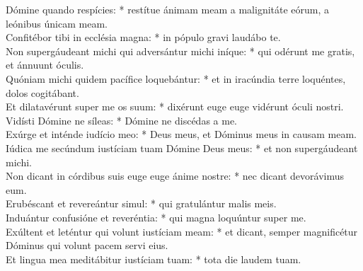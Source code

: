 {	Dómine quando respícies: * restítue ánimam meam a malignitáte eórum, a leónibus únicam meam. \\
	Confitébor tibi in ecclésia magna: * in pópulo gravi laudábo te. \\
	Non supergáudeant michi qui adversántur michi iníque: * qui odérunt me gratis, et ánnuunt óculis. \\
	Quóniam michi quidem pacífice loquebántur: * et in iracúndia terre loquéntes, dolos cogitábant. \\
	Et dilatavérunt super me os suum: * dixérunt euge euge vidérunt óculi nostri. \\
	Vidísti Dómine ne síleas: * Dómine ne discédas a me. \\
	Exúrge et inténde iudício meo: * Deus meus, et Dóminus meus in causam meam. \\
	Iúdica me secúndum iustíciam tuam Dómine Deus meus: * et non supergáudeant michi. \\
	Non dicant in córdibus suis euge euge ánime nostre: * nec dicant devorávimus eum. \\
	Erubéscant et revereántur simul: * qui gratulántur malis meis. \\
	Induántur confusióne et reveréntia: * qui magna loquúntur super me. \\
	Exúltent et leténtur qui volunt iustíciam meam: * et dicant, semper magnificétur Dóminus qui volunt pacem servi eius. \\
	Et lingua mea meditábitur iustíciam tuam: * tota die laudem tuam.
}


